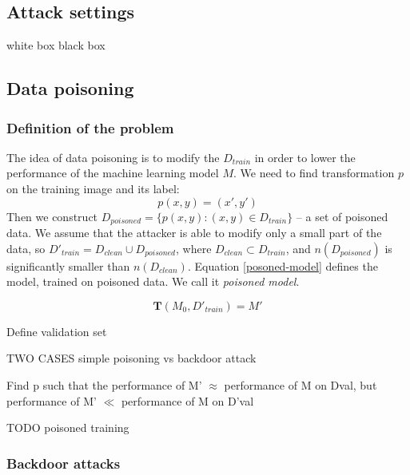 \documentclass[14pt,a4paper]{extarticle}
\newcounter{e}
\numberwithin{equation}{section}
\numberwithin{figure}{section}
\begin{document}
    
    
    \subsection{Attack settings}
    white box
    black box

\subsection{Data poisoning}
\subsubsection{Definition of the problem}

The idea of data poisoning is to modify the $D_{train}$ in order to lower the performance of the machine learning model $M$. We need to find transformation $p$ on the training image and its label:
\begin{equation}
    \label{poisonin}
    p(x, y) = (x', y')
\end{equation}
Then we construct $D_{poisoned}=\{p(x, y) : (x, y) \in D_{train}\}$ -- a set of poisoned data. We assume that the attacker is able to modify only a small part of the data, so $D'_{train} = D_{clean} \cup D_{poisoned}$, where $D_{clean} \subset D_{train}$, and $n(D_{poisoned})$ is significantly smaller than $n(D_{clean})$. Equation \ref{posoned-model} defines the model, trained on poisoned data. We call it \textit{poisoned model}.

\begin{equation}
    \label{poisoned-model}
    \mathbf{T}(M_{0}, D'_{train}) = M'
\end{equation}

Define validation set



TWO CASES simple poisoning vs backdoor attack

Find p such that the performance of M' $\approx$ performance of M on Dval, but performance of M' $\ll$ performance of M on D'val 

TODO poisoned training

\subsubsection{Backdoor attacks}
\end{document}
